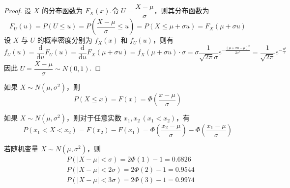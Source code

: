 \begin{proof}
    设 $X$ 的分布函数为 $F_X(x)$.令 $U = \dfrac{X - \mu}{\sigma}$，则其分布函数为
    $$
    F_U(u) = P(U \leqslant u) = P(\dfrac{X - \mu}{\sigma} \leqslant u) = P(X \leqslant \mu + \sigma u) = F_X(\mu + \sigma u)
    $$
    设 $X$ 与 $U$ 的概率密度分别为 $f_X(x)$ 和 $f_U(u)$，则有
    $$
    f_U(u) = \dfrac{\text{d}}{\text{d}u} F_U(u) = \dfrac{\text{d}}{\text{d}u} F_X(\mu + \sigma u) = f_X(\mu + \sigma u) \cdot \sigma = \sigma \dfrac{1}{\sqrt{2\pi} \sigma} e^{-\frac{(\mu + \sigma u - \mu)^2}{2 \sigma^2}} = \dfrac{1}{\sqrt{2\pi}} e^{-\frac{u^2}{2}}
    $$
    因此 $U = \dfrac{X - \mu}{\sigma} \sim N(0,1)$.
\end{proof}

\begin{corollary}
    \indent 如果 $X \sim N(\mu,\sigma^2)$，则
    \begin{equation} \label{equation:standard}
        P(X \leqslant x) = F(x) = \varPhi(\dfrac{x - \mu}{\sigma})
    \end{equation}
\end{corollary}

\begin{corollary}
    \indent 如果 $X \sim N(\mu,\sigma^2)$，则对于任意实数 $x_1,x_2\,(x_1 < x_2)$，有
    \begin{equation} \label{equation:正态随机变量的标准化}
        P(x_1 < X < x_2) = F(x_2)-F(x_1) = \varPhi(\dfrac{x_2-\mu}{\sigma}) - \varPhi(\dfrac{x_1-\mu}{\sigma})
    \end{equation}
\end{corollary}

\begin{conclusion}[][$3\sigma$ 规则]
    \indent 若随机变量 $X \sim N(\mu, \sigma^2)$，则
    $$
    \begin{aligned}
        & P(|X - \mu| < \sigma) = 2\varPhi(1) - 1 = 0.6826 \\
        & P(|X - \mu| < 2\sigma) = 2\varPhi(2) - 1 = 0.9544 \\
        & P(|X - \mu| < 3\sigma) = 2\varPhi(3) - 1 = 0.9974
    \end{aligned}
    $$
\end{conclusion}


